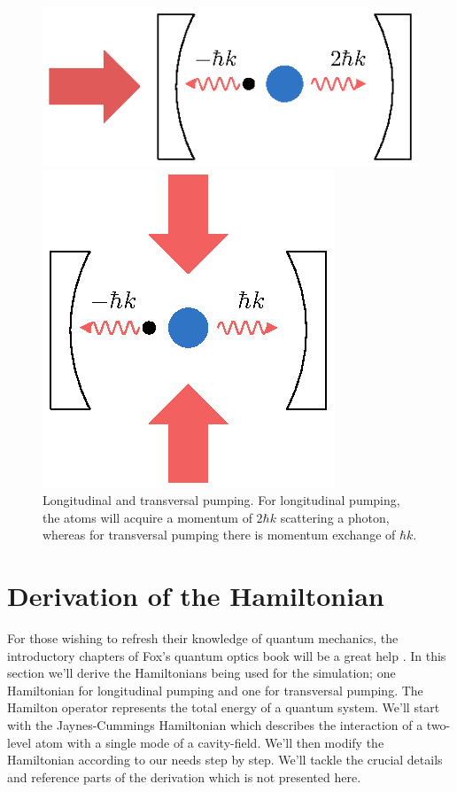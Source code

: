 \begin{figure}[!htb]
	\begin{minipage}[b]{.5\linewidth}
	\centering
	\includegraphics[width=.8\linewidth]{images/pump_long.eps}
	\end{minipage}
%
	\begin{minipage}[b]{.5\linewidth}
	\centering
	\includegraphics[width=.8\linewidth]{images/pump_trans.eps}
	\end{minipage}
\caption{Longitudinal and transversal pumping. For longitudinal pumping, the atoms will acquire a momentum of $2\hbar k$ scattering a photon, whereas for transversal pumping there is momentum exchange of $\hbar k$.}
\label{pumping}
\end{figure}
\FloatBarrier

\section{Derivation of the Hamiltonian}
For those wishing to refresh their knowledge of quantum mechanics, the introductory chapters of Fox's quantum optics book will be a great help \cite{fox}. In this section we'll derive the Hamiltonians being used for the simulation; one Hamiltonian for longitudinal pumping and one for transversal pumping. The Hamilton operator represents the total energy of a quantum system. We'll start with the Jaynes-Cummings Hamiltonian which describes the interaction of a two-level atom with a single mode of a cavity-field. We'll then modify the Hamiltonian according to our needs step by step. We'll tackle the crucial details and reference parts of the derivation which is not presented here.

